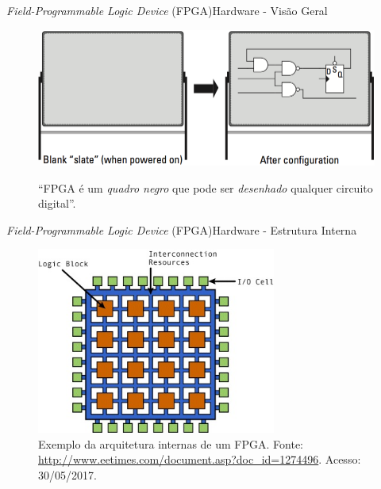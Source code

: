     
    	\begin{frame}{\textit{Field-Programmable Logic Device} (FPGA)}{Hardware - Visão Geral}
    		\begin{figure}[h]
    			\centering
    			\includegraphics[width=1\textwidth]{img/rt-board.png}
    			\label{fig:quadro}
                \caption{``FPGA é um \textit{quadro negro} que pode ser \textit{desenhado} qualquer circuito digital''.}
    		\end{figure}
    	\end{frame}
    
    \begin{frame}{\textit{Field-Programmable Logic Device} (FPGA)}{Hardware - Estrutura Interna} 
    \vspace{-1em}
    \begin{figure}[h] \centering
        \includegraphics[width=0.7\textwidth]{img/rt-arch_fpga.jpg}
        \vspace{-0.5em}
        \caption{Exemplo da arquitetura internas de um FPGA. Fonte: \url{http://www.eetimes.com/document.asp?doc_id=1274496}. Acesso: 30/05/2017.}
    \end{figure}
    \end{frame}
    
